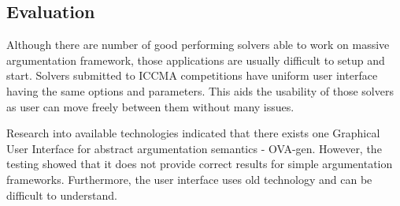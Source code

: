 \subsection{Evaluation}
Although there are number of good performing solvers able to work on massive argumentation framework, those applications are usually difficult to setup and start. Solvers submitted to ICCMA competitions have uniform user interface having the same options and parameters. This aids the usability of those solvers as user can move freely between them without many issues.

Research into available technologies indicated that there exists one Graphical User Interface for abstract argumentation semantics - OVA-gen. However, the testing showed that it does not provide correct results for simple argumentation frameworks. Furthermore, the user interface uses old technology and can be difficult to understand.
